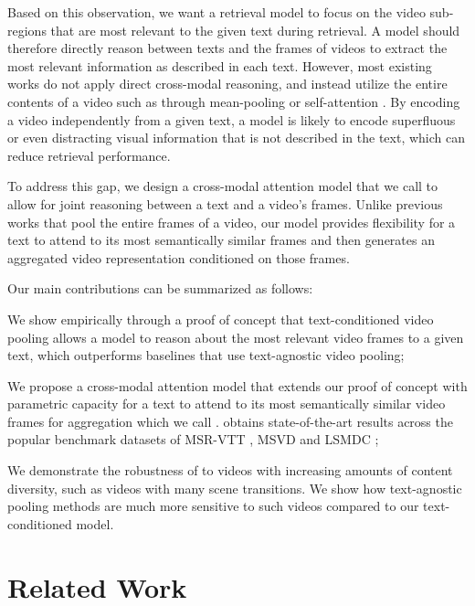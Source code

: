 \documentclass[10pt,twocolumn,letterpaper]{article}
\begin{document}
Based on this observation, we want a retrieval model to focus on the video sub-regions that are most relevant to the given text during retrieval. A model should therefore directly reason between texts and the frames of videos to extract the most relevant information as described in each text. However, most existing works do not apply direct cross-modal reasoning, and instead utilize the entire contents of a video such as through mean-pooling or self-attention \cite{miech2019howto100m, gabeur2020multi, bain2021frozen, luo2021clip4clip}. By encoding a video independently from a given text, a model is likely to encode superfluous or even distracting visual information that is not described in the text, which can reduce retrieval performance.


To address this gap, we design a cross-modal attention model that we call \textbf{\ModelName{}} to allow for joint reasoning between a text and a video's frames. Unlike previous works that pool the entire frames of a video, our model provides flexibility for a text to attend to its most semantically similar frames and then generates an aggregated video representation conditioned on those frames.

Our main contributions can be summarized as follows: \begin{enumerate*}[label=(\roman*)]
\item We show empirically through a proof of concept that text-conditioned video pooling allows a model to reason about the most relevant video frames to a given text, which outperforms baselines that use text-agnostic video pooling;
\item We propose a cross-modal attention model that extends our proof of concept with parametric capacity for a text to attend to its most semantically similar video frames for aggregation which we call \ModelName{}. \ModelName{} obtains state-of-the-art results across the popular benchmark datasets of MSR-VTT \cite{xu2016msr}, MSVD \cite{chen2011collecting} and LSMDC \cite{rohrbach2017movie};

\item We demonstrate the robustness of \ModelName{} to videos with increasing amounts of content diversity, such as videos with many scene transitions. We show how text-agnostic pooling methods are much more sensitive to such videos  compared to our text-conditioned \ModelName{} model.

\end{enumerate*}

\section{Related Work}
\end{document}
